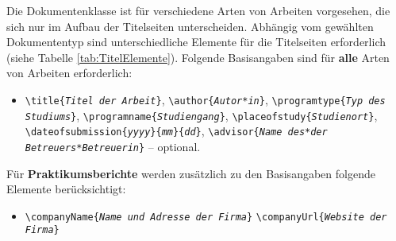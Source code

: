 Die Dokumentenklasse ist für verschiedene Arten von Arbeiten vorgesehen, die sich nur im Aufbau 
der Titelseiten unterscheiden. 
Abhängig vom gewählten Dokumententyp sind unterschiedliche Elemente für die Titelseiten erforderlich (siehe Tabelle \ref{tab:TitelElemente}).
Folgende Basisangaben sind für \textbf{alle} Arten von Arbeiten
erforderlich:
%
\begin{itemize}
\item[] %
\verb!\title{!\texttt{\em Titel der Arbeit}\verb!}!, \newline%
\verb!\author{!\texttt{\em Autor*in}\verb!}!, \newline%
\verb!\programtype{!\texttt{\em Typ des Studiums}\verb!}!, \newline%
\verb!\programname{!\texttt{\em Studiengang}\verb!}!, \newline%
\verb!\placeofstudy{!\texttt{\em Studienort}\verb!}!, \newline%
\verb!\dateofsubmission{!\texttt{\em yyyy}\verb!}{!\texttt{\em mm}\verb!}{!\texttt{\em dd}\verb!}!, \newline%
\verb!\advisor{!\texttt{\em Name des*der Betreuers*Betreuerin}\verb!}! -- optional.
\end{itemize}
%

\noindent Für \textbf{Praktikumsberichte} werden zusätzlich zu den Basisangaben folgende
Elemente berücksichtigt:
%
\begin{itemize}
\item[] %
\verb!\companyName{!\texttt{\em Name und Adresse der Firma}\verb!}! \newline%
\verb!\companyUrl{!\texttt{\em Website der Firma}\verb!}!
\end{itemize}


